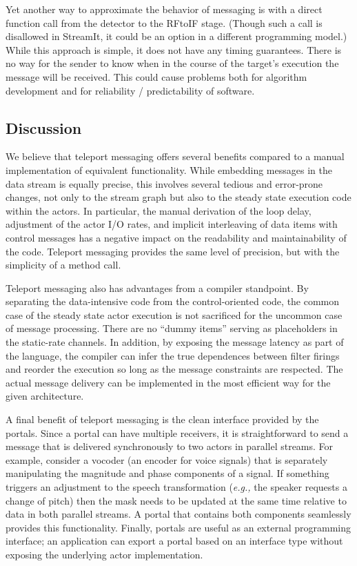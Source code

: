 Yet another way to approximate the behavior of messaging is with a
direct function call from the detector to the RFtoIF stage.  (Though
such a call is disallowed in StreamIt, it could be an option in a
different programming model.)  While this approach is simple, it does
not have any timing guarantees.  There is no way for the sender to
know when in the course of the target's execution the message will be
received.  This could cause problems both for algorithm development
and for reliability / predictability of software.

\vspace{12pt}
\subsection{Discussion}

We believe that teleport messaging offers several benefits compared to
a manual implementation of equivalent functionality.  While embedding
messages in the data stream is equally precise, this involves several
tedious and error-prone changes, not only to the stream graph but also
to the steady state execution code within the actors.  In particular,
the manual derivation of the loop delay, adjustment of the actor I/O
rates, and implicit interleaving of data items with control messages
has a negative impact on the readability and maintainability of the
code.  Teleport messaging provides the same level of precision, but
with the simplicity of a method call.

Teleport messaging also has advantages from a compiler standpoint.  By
separating the data-intensive code from the control-oriented code, the
common case of the steady state actor execution is not sacrificed for
the uncommon case of message processing.  There are no ``dummy items''
serving as placeholders in the static-rate channels.  In addition, by
exposing the message latency as part of the language, the compiler can
infer the true dependences between filter firings and reorder the
execution so long as the message constraints are respected.  The
actual message delivery can be implemented in the most efficient way
for the given architecture.

A final benefit of teleport messaging is the clean interface provided
by the portals.  Since a portal can have multiple receivers, it is
straightforward to send a message that is delivered synchronously to
two actors in parallel streams.  For example, consider a vocoder (an
encoder for voice signals) that is separately manipulating the
magnitude and phase components of a signal.  If something triggers an
adjustment to the speech transformation ({\it e.g.,} the speaker
requests a change of pitch) then the mask needs to be updated at the
same time relative to data in both parallel streams.  A portal that
contains both components seamlessly provides this functionality.
Finally, portals are useful as an external programming interface; an
application can export a portal based on an interface type without
exposing the underlying actor implementation.

